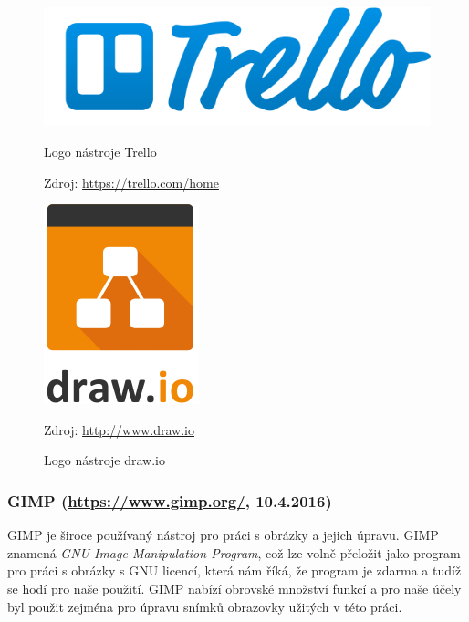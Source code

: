 \documentclass[czech,master,public,dept460,male,java,cpdeclaration]{diploma}
\begin{document}
\begin{figure}[H]
\begin{minipage}{.5\textwidth}
\centering
                \includegraphics[scale=0.3]{img/trello-logo-blue.png}
        \caption{Logo nástroje Trello}
                \label{fig:trellologo}
                \centering Zdroj: \url{https://trello.com/home}
\end{minipage}
\begin{minipage}{.5\textwidth}
\centering
                \includegraphics[scale=0.2]{img/drawiologo.png}
        \caption{Logo nástroje draw.io}
        \label{fig:iologo}
        \centering Zdroj: \url{http://www.draw.io}
    \end{minipage}
\end{figure}



\subsubsection{GIMP (\url{https://www.gimp.org/}, 10.4.2016)}
GIMP je široce používaný nástroj pro práci s obrázky a jejich úpravu. GIMP znamená
 \textit{GNU Image Manipulation Program}, což lze volně přeložit jako program pro práci s obrázky s GNU
 licencí, která nám říká, že program je zdarma a tudíž se hodí pro naše použití. GIMP nabízí obrovské
 množství funkcí a pro naše účely byl použit zejména pro úpravu snímků obrazovky užitých v této práci.
\end{document}
